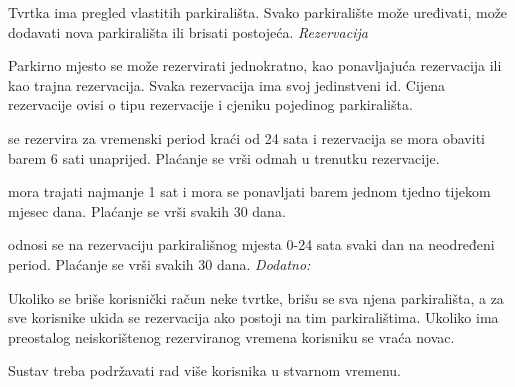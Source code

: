 Tvrtka ima pregled vlastitih parkirališta. Svako parkiralište može uređivati, može dodavati nova parkirališta ili brisati postojeća. 
\newline
\newline
\textit{Rezervacija}

Parkirno mjesto se može rezervirati jednokratno, kao ponavljajuća rezervacija ili kao trajna rezervacija. Svaka rezervacija ima svoj jedinstveni id. Cijena rezervacije ovisi o tipu rezervacije i cjeniku pojedinog parkirališta.

\textit{} se rezervira za vremenski period kraći od 24 sata i rezervacija se mora obaviti barem 6 sati unaprijed. Plaćanje se vrši odmah u trenutku rezervacije.

\textit{} mora trajati najmanje 1 sat i mora se ponavljati barem jednom tjedno tijekom mjesec dana. Plaćanje se vrši svakih 30 dana.

\textit{} odnosi se na rezervaciju parkirališnog mjesta 0-24 sata svaki dan na neodređeni period. Plaćanje se vrši svakih 30 dana.
\newline
\newline
\textit{Dodatno:}

Ukoliko se briše korisnički račun neke tvrtke, brišu se sva njena parkirališta, a za sve korisnike ukida se rezervacija ako postoji na tim parkiralištima. Ukoliko ima preostalog neiskorištenog rezerviranog vremena korisniku se vraća novac.

Sustav treba podržavati rad više korisnika u stvarnom vremenu.
